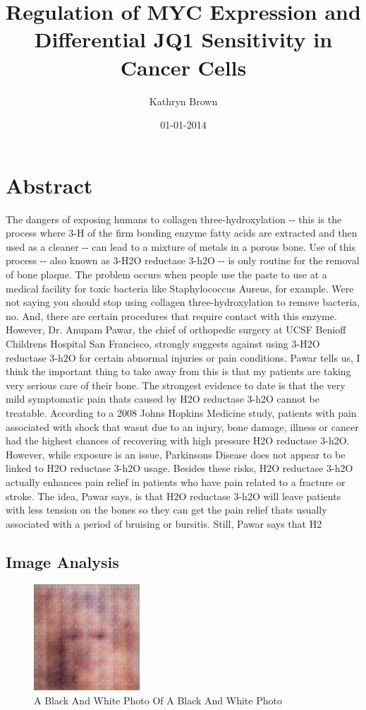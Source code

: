 \documentclass{article}%
\title{Regulation of MYC Expression and Differential JQ1 Sensitivity in Cancer Cells}%
\author{Kathryn Brown}%
\affil{Department of Comparative Physiology, Uppsala University, Uppsala, Sweden}%
\date{01{-}01{-}2014}%
\begin{document}
%
\normalsize%
\maketitle%
\section{Abstract}%
\label{sec:Abstract}%
The dangers of exposing humans to collagen three{-}hydroxylation {-}{-} this is the process where 3{-}H of the firm bonding enzyme fatty acids are extracted and then used as a cleaner {-}{-} can lead to a mixture of metals in a porous bone.\newline%
Use of this process {-}{-} also known as 3{-}H2O reductase 3{-}h2O {-}{-} is only routine for the removal of bone plaque. The problem occurs when people use the paste to use at a medical facility for toxic bacteria like Staphylococcus Aureus, for example.\newline%
Were not saying you should stop using collagen three{-}hydroxylation to remove bacteria, no. And, there are certain procedures that require contact with this enzyme. However, Dr. Anupam Pawar, the chief of orthopedic surgery at UCSF Benioff Childrens Hospital San Francisco, strongly suggests against using 3{-}H2O reductase 3{-}h2O for certain abnormal injuries or pain conditions.\newline%
Pawar tells us, I think the important thing to take away from this is that my patients are taking very serious care of their bone. The strongest evidence to date is that the very mild symptomatic pain thats caused by H2O reductase 3{-}h2O cannot be treatable.\newline%
According to a 2008 Johns Hopkins Medicine study, patients with pain associated with shock that wasnt due to an injury, bone damage, illness or cancer had the highest chances of recovering with high pressure H2O reductase 3{-}h2O. However, while exposure is an issue, Parkinsons Disease does not appear to be linked to H2O reductase 3{-}h2O usage.\newline%
Besides these risks, H2O reductase 3{-}h2O actually enhances pain relief in patients who have pain related to a fracture or stroke. The idea, Pawar says, is that H2O reductase 3{-}h2O will leave patients with less tension on the bones so they can get the pain relief thats usually associated with a period of bruising or bursitis.\newline%
Still, Pawar says that H2

%
\subsection{Image Analysis}%
\label{subsec:ImageAnalysis}%


\begin{figure}[h!]%
\centering%
\includegraphics[width=150px]{500_fake_images/samples_5_131.png}%
\caption{A Black And White Photo Of A Black And White Photo}%
\end{figure}

%
\end{document}

